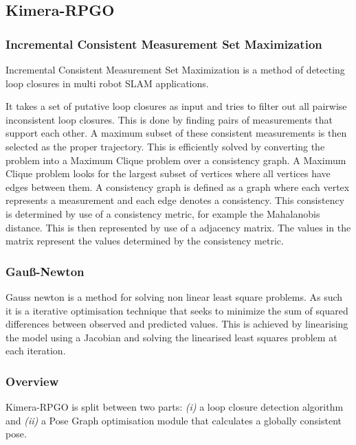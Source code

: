 \documentclass[11pt,a4paper]{article}
\begin{document}
\subsection{Kimera-RPGO}

\subsubsection{Incremental Consistent Measurement Set Maximization} \label{pre:PCM}
Incremental Consistent Measurement Set Maximization is a  method of detecting loop closures in multi robot SLAM applications. 

It takes a set of putative loop closures as input and tries to filter out all pairwise inconsistent loop closures. 
This is done by finding pairs of measurements that support each other. 
A maximum subset of these consistent measurements is then selected as the proper trajectory.
This is efficiently solved by converting the problem into a Maximum Clique problem over a consistency graph. 
A Maximum Clique problem looks for the largest subset of vertices where all vertices have edges between them. 
A consistency graph is defined as a graph where each vertex represents a measurement and each edge denotes a consistency.
This consistency is determined by use of a consistency metric, for example the Mahalanobis distance.
This is then represented by use of a adjacency matrix.
The values in the matrix represent the values determined by the consistency metric. 
\subsubsection{Gauß-Newton} \label{pre:Gauß-netwon}
Gauss newton is a method for solving non linear least square problems. 
As such it is a iterative optimisation technique that seeks to minimize the sum of squared differences between observed and predicted values.
This is achieved by linearising the model using a Jacobian and solving the linearised least squares problem at each iteration.
\subsubsection {Overview}
Kimera-RPGO is split between two parts: \textit{(i)} a loop closure detection algorithm and \textit{(ii)} a Pose Graph optimisation module that calculates a globally consistent pose.
\end{document}
